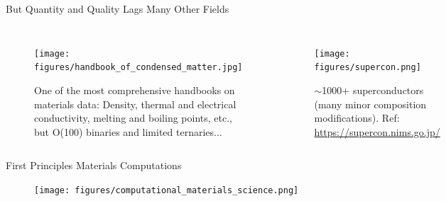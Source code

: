 \documentclass[aspectratio=169]{beamer}
\begin{document}
    \begin{frame}{But Quantity and Quality Lags Many Other Fields}

        \begin{columns}
            \begin{figure}
                \centering
                \texttt{[image: figures/handbook\_of\_condensed\_matter.jpg]}
                \caption{One of the most comprehensive handbooks on materials data: Density, thermal and electrical conductivity, melting and boiling points, etc., but O(100) binaries and limited ternaries...
                }
            \end{figure}
            \begin{figure}
                \centering
                \texttt{[image: figures/supercon.png]}
                \caption{$\sim$1000+ superconductors (many minor composition modifications). Ref: \url{ https://supercon.nims.go.jp/}
                }
            \end{figure}
        \end{columns}
    \end{frame}

    \begin{frame}{First Principles Materials Computations}
        \begin{figure}
            \centering
            \texttt{[image: figures/computational\_materials\_science.png]}
        \end{figure}
    \end{frame}
\end{document}
